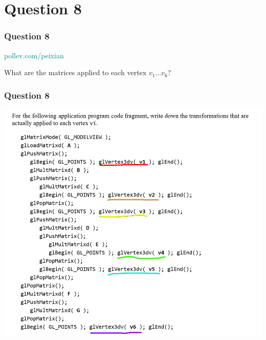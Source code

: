 \documentclass{beamer}
\begin{document}
\section{Question 8}

\begin{frame}
    \frametitle{Question 8}

    \begin{tcolorbox}[colback=teal!5!white]
        \textcolor{teal}{pollev.com/peixian}
    \end{tcolorbox}

    What are the matrices applied to each vertex $v_1 \dots v_6$?

\end{frame}

\begin{frame}
    \frametitle{Question 8}

    \begin{center}
        \includegraphics[scale=0.5]{q8.png}
    \end{center}

\end{frame}
\end{document}
